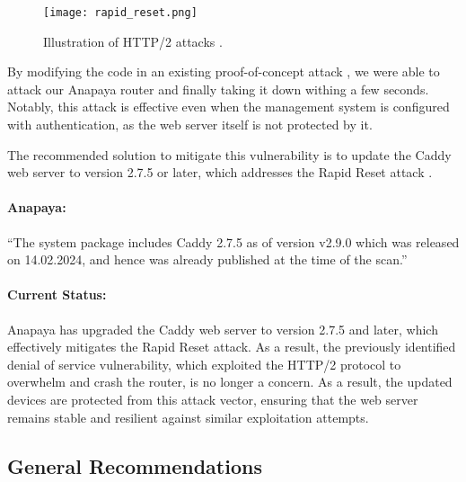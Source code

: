 \begin{figure}
    \centering
    \texttt{[image: rapid\_reset.png]}
    \caption{Illustration of HTTP/2 attacks \cite{googleWorksNovel}.}
    \label{fig:rapid_reset}
\end{figure}

By modifying the code in an existing proof-of-concept attack \cite{githubGitHubMicrictorhttp2rststream}, we were able to attack our Anapaya router and finally taking it down withing a few seconds.
Notably, this attack is effective even when the management system is configured with authentication, as the web server itself is not protected by it.

The recommended solution to mitigate this vulnerability is to update the Caddy web server to version 2.7.5 or later, which addresses the Rapid Reset attack \cite{githubReleasesCaddyservercaddy}.

\begin{boxH}
\paragraph{Anapaya:}
``The system package includes Caddy 2.7.5 as of version v2.9.0 which was released on 14.02.2024, and hence was already published at the time of the scan.''
\end{boxH}

\paragraph{Current Status:}
Anapaya has upgraded the Caddy web server to version 2.7.5 and later, which effectively mitigates the Rapid Reset attack.
As a result, the previously identified denial of service vulnerability, which exploited the HTTP/2 protocol to overwhelm and crash the router, is no longer a concern.
As a result, the updated devices are protected from this attack vector, ensuring that the web server remains stable and resilient against similar exploitation attempts.

\subsection{General Recommendations}
\label{sec:general-recommendations}

